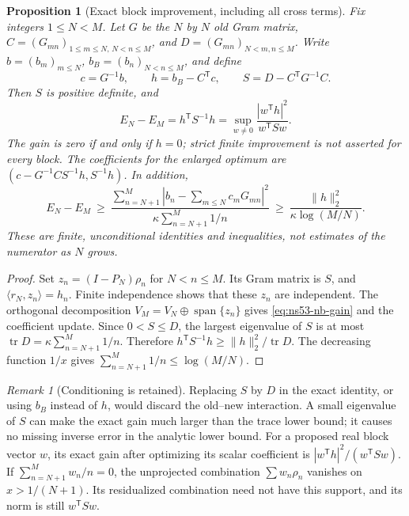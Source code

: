 \documentclass[11pt]{article}
\newtheorem{proposition}[theorem]{Proposition}
\theoremstyle{remark}
\newtheorem{remark}[theorem]{Remark}
\begin{document}
\begin{proposition}[Exact block improvement, including all cross terms]
\label{prop:ns53-nb-block-gain}
Fix integers $1\leq N<M$. Let $G$ be the $N$ by $N$ old Gram matrix,
$C=(G_{mn})_{1\leq m\leq N,\,N<n\leq M}$, and
$D=(G_{mn})_{N<m,n\leq M}$.
Write $b=(b_m)_{m\leq N}$, $b_B=(b_n)_{N<n\leq M}$, and define
\begin{equation}
 c=G^{-1}b,\qquad h=b_B-C^{\mathsf T}c,\qquad
 S=D-C^{\mathsf T}G^{-1}C.
 \label{eq:ns53-nb-schur}
\end{equation}
Then $S$ is positive definite, and
\begin{equation}
 E_N-E_M=h^{\mathsf T}S^{-1}h
 =\sup_{w\ne0}\frac{|w^{\mathsf T}h|^2}{w^{\mathsf T}Sw}.
 \label{eq:ns53-nb-gain}
\end{equation}
The gain is zero if and only if $h=0$; strict finite improvement is not
asserted for every block. The coefficients for the enlarged optimum are
$(c-G^{-1}CS^{-1}h,S^{-1}h)$. In addition,
\begin{equation}
 E_N-E_M\ \geq\
 \frac{\sum_{n=N+1}^M|b_n-\sum_{m\leq N}c_mG_{mn}|^2}
 {\kappa\sum_{n=N+1}^M1/n}
 \ \geq\
 \frac{\|h\|_2^2}{\kappa\log(M/N)}.
 \label{eq:ns53-nb-trace-gain}
\end{equation}
These are finite, unconditional identities and inequalities, not estimates
of the numerator as $N$ grows.
\end{proposition}

\begin{proof}
Set $z_n=(I-P_N)\rho_n$ for $N<n\leq M$. Its Gram matrix is $S$,
and $\langle r_N,z_n\rangle=h_n$. Finite independence shows that these
$z_n$ are independent. The orthogonal decomposition
$V_M=V_N\mathbin{\oplus}\operatorname{span}\{z_n\}$ gives
\eqref{eq:ns53-nb-gain} and the coefficient update. Since
$0<S\leq D$, the largest eigenvalue of $S$ is at most
$\operatorname{tr}D=\kappa\sum_{n=N+1}^M1/n$. Therefore
$h^{\mathsf T}S^{-1}h\geq\|h\|_2^2/\operatorname{tr}D$.
The decreasing function $1/x$ gives
$\sum_{n=N+1}^M1/n\leq\log(M/N)$.
\end{proof}

\begin{remark}[Conditioning is retained]
Replacing $S$ by $D$ in the exact identity, or using $b_B$ instead of $h$,
would discard the old--new interaction. A small eigenvalue of $S$ can
make the exact gain much larger than the trace lower bound; it causes no
missing inverse error in the analytic lower bound. For a proposed real
block vector $w$, its exact gain after optimizing its scalar coefficient
is $|w^{\mathsf T}h|^2/(w^{\mathsf T}Sw)$. If
$\sum_{n=N+1}^M w_n/n=0$, the unprojected combination
$\sum w_n\rho_n$ vanishes on $x>1/(N+1)$. Its residualized combination
need not have this support, and its norm is still $w^{\mathsf T}Sw$.
\end{remark}
\end{document}
